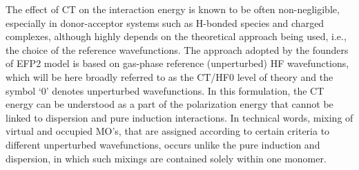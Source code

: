 \documentclass[aip,jcp,amsmath,amssymb,reprint,floatfix]{revtex4-1}
\begin{document}
The effect of CT on the interaction energy 
is known to be often non\hyp{}negligible, especially
in donor\hyp{}acceptor systems such as H\hyp{}bonded species
and charged complexes,\cite{Devarajan.Gaenko.Gordon.Windus.Fragmentation.2017,
Devarajan.Windus.Gordon.JPCA.2011} 
although highly depends on the theoretical
approach being used, i.e., the choice of the reference
wavefunctions.
The approach adopted by the founders of EFP2 model
is based on gas\hyp{}phase reference (unperturbed) HF wavefunctions,
which will be here broadly referred to as the CT/HF0 level of theory
and the symbol `0' denotes unperturbed wavefunctions.
In this formulation, the CT energy can be understood
as a part of the polarization energy that cannot be
linked to dispersion and pure induction interactions. 
In technical words, mixing of virtual and occupied MO's,
that are assigned according to certain criteria 
to different unperturbed wavefunctions, occurs
unlike the pure induction and dispersion, in which such mixings are contained
solely within one monomer.\cite{Stone.TheTheoryOfIntermolecularForces.1996}
%
%
\end{document}
